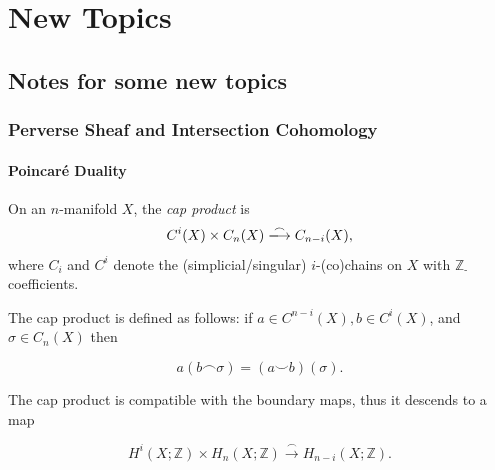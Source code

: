 \documentclass[lang=en,12pt,twoside]{textbook}
\begin{document}
\begin{titlepage}
    \tableofcontents
    \restoregeometry
\end{titlepage}


\part{New Topics}


\chapter{Notes for some new topics}

\section{Perverse Sheaf and Intersection Cohomology}

\subsection{Poincar\'e Duality}

\begin{definition}
    On an $n$-manifold $X$, the \emph{cap product} is 
    \[C^i(X)\times C_n(X)\xlongrightarrow[]{\frown} C_{n-i}(X),\]
    where $C_i$ and $C^i$ denote the (simplicial/singular) $i$-(co)chains on $X$ with $\mathbb{Z}_{\text {- }}$ coefficients.
\end{definition}

The cap product is defined as follows: if $a \in C^{n-i}(X), b \in C^i(X)$, and $\sigma \in C_n(X)$ then

$$
a(b \frown \sigma)=(a \smile b)(\sigma).
$$


The cap product is compatible with the boundary maps, thus it descends to a map

$$
H^i(X ; \mathbb{Z}) \times H_n(X ; \mathbb{Z}) \xrightarrow{\frown} H_{n-i}(X ; \mathbb{Z}).
$$
\end{document}
